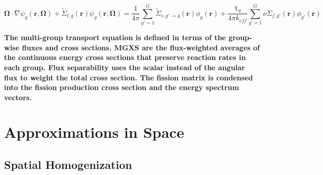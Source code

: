 \begin{dmath}
\label{eqn:chap2-transport-mg-4}
\mathbf{\Omega} \cdot \nabla \psi_{g}(\mathbf{r},\mathbf{\Omega}) + \tilde{\Sigma}_{t,g}(\mathbf{r})\psi_{g}(\mathbf{r},\mathbf{\Omega}) = \frac{1}{4\pi} \sum_{g'=1}^{G} \tilde{\Sigma}_{s,g' \rightarrow g}(\mathbf{r}) \phi_{g}(\mathbf{r}) + \frac{\chi_{g}}{4\pi k_{eff}}\sum_{g'=1}^{G} \nu\Sigma_{f,g'}(\mathbf{r})\phi_{g'}(\mathbf{r})
\end{dmath}



\begin{emphbox}
\textbf{The multi-group transport equation is defined in terms of the group-wise fluxes and cross sections. \ac{MGXS} are the flux-weighted averages of the continuous energy cross sections that preserve reaction rates in each group. Flux separability uses the scalar instead of the angular flux to weight the total cross section. The fission matrix is condensed into the fission production cross section and the energy spectrum vectors.}
\end{emphbox}


\section{Approximations in Space}
\label{sec:chap2-approx-space}

\subsection{Spatial Homogenization}
\label{subsec:chap2-space}


